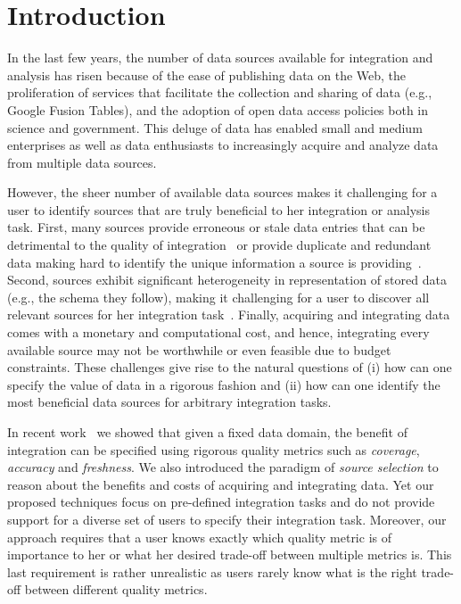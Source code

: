\documentclass{sig-alternate}
\begin{document}
\section{Introduction}
In the last few years, the number of data sources available for integration and analysis has risen because of the ease of publishing data on the Web, the proliferation of services that facilitate the collection and sharing of data (e.g., Google Fusion Tables), and  the adoption of open data access policies both in science and government. This deluge of data has enabled small and medium enterprises as well as data enthusiasts to increasingly acquire and analyze data from multiple data sources. 

However, the sheer number of available data sources makes it challenging for a user to identify sources that are truly beneficial to her integration or analysis task. First, many sources provide erroneous or stale data entries that can be detrimental to the quality of integration~\cite{Dong_vldb:2009, li:2012} or provide  duplicate and redundant data making hard to identify the unique information a source is providing~\cite{bronzi:2013, li:2012}. Second, sources exhibit significant heterogeneity in representation of stored data (e.g., the schema they follow), making it challenging for a user to discover all relevant sources for her integration task~\cite{dassarma:2012}. Finally, acquiring and integrating data comes with a monetary and computational cost, and hence, integrating every available source may not be worthwhile or even feasible due to budget constraints. These challenges give rise to the natural questions of (i) how can one specify the value of data in a rigorous fashion and (ii) how can one identify the most beneficial data sources for arbitrary integration tasks. 

In recent work~\cite{dong:vldb13, rekatsinas:2014} we showed that given a fixed data domain, the benefit of integration can be specified using rigorous quality metrics such as {\em coverage}, {\em accuracy} and {\em freshness}. We also introduced the paradigm of {\em source selection} to reason about the benefits and costs of acquiring and integrating data. Yet our proposed techniques focus on pre-defined integration tasks and do not provide support for a diverse set of users to specify their integration task. Moreover, our approach requires that a user knows exactly which quality metric is of importance to her or what her desired trade-off between multiple metrics is. This last requirement is rather unrealistic as users rarely know what is the right trade-off between different quality metrics. 
\end{document}
